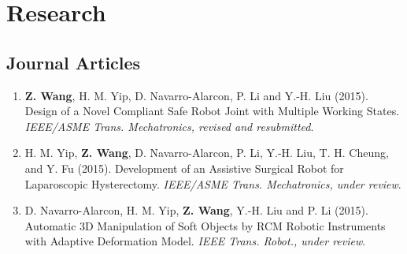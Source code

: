 \documentclass[10pt,letterpaper]{article}
\begin{document}
\section*{Research}

\subsection*{Journal Articles}
\begin{enumerate}
\item \textbf{Z. Wang}, H. M. Yip, D. Navarro-Alarcon, P. Li and Y.-H. Liu (2015).
  Design of a Novel Compliant Safe Robot Joint with Multiple Working States.
  \textit{{IEEE/ASME} Trans. Mechatronics, revised and resubmitted}.
\item H. M. Yip, \textbf{Z. Wang}, D. Navarro-Alarcon, P. Li, Y.-H. Liu, T. H. Cheung, and Y. Fu (2015).
  Development of an Assistive Surgical Robot for Laparoscopic Hysterectomy.
  \textit{{IEEE/ASME} Trans. Mechatronics, under review}.
\item D. Navarro-Alarcon, H. M. Yip, \textbf{Z. Wang}, Y.-H. Liu and P. Li (2015).
  Automatic 3D Manipulation of Soft Objects by RCM Robotic Instruments with Adaptive Deformation Model.
  \textit{{IEEE} Trans. Robot., under review}.
\end{enumerate}
\end{document}
